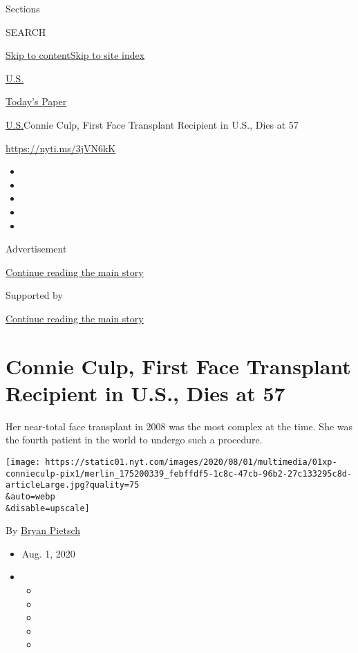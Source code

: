 Sections

SEARCH

\protect\hyperlink{site-content}{Skip to
content}\protect\hyperlink{site-index}{Skip to site index}

\href{https://www.nytimes.com/section/us}{U.S.}

\href{https://myaccount.nytimes.com/auth/login?response_type=cookie\&client_id=vi}{}

\href{https://www.nytimes.com/section/todayspaper}{Today's Paper}

\href{/section/us}{U.S.}\textbar{}Connie Culp, First Face Transplant
Recipient in U.S., Dies at 57

\url{https://nyti.ms/3jVN6kK}

\begin{itemize}
\item
\item
\item
\item
\item
\end{itemize}

Advertisement

\protect\hyperlink{after-top}{Continue reading the main story}

Supported by

\protect\hyperlink{after-sponsor}{Continue reading the main story}

\hypertarget{connie-culp-first-face-transplant-recipient-in-us-dies-at-57}{%
\section{Connie Culp, First Face Transplant Recipient in U.S., Dies at
57}\label{connie-culp-first-face-transplant-recipient-in-us-dies-at-57}}

Her near-total face transplant in 2008 was the most complex at the time.
She was the fourth patient in the world to undergo such a procedure.

\texttt{[image: https://static01.nyt.com/images/2020/08/01/multimedia/01xp-connieculp-pix1/merlin\_175200339\_febffdf5-1c8c-47cb-96b2-27c133295c8d-articleLarge.jpg?quality=75\\\&auto=webp\\\&disable=upscale]}

By \href{https://www.nytimes.com/by/bryan-pietsch}{Bryan Pietsch}

\begin{itemize}
\item
  Aug. 1, 2020
\item
  \begin{itemize}
  \item
  \item
  \item
  \item
  \item
  \end{itemize}
\end{itemize}

